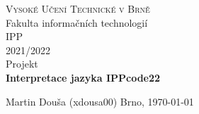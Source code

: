 \documentclass{article}
\begin{document}
\clearpage
\begin{titlepage}
	\begin{center}
		\textsc{\LARGE Vysoké Učení Technické v Brně}\\[0.5cm]
		{\LARGE Fakulta informačních technologií }\\[4.0cm]

		\textsc{\LARGE IPP}\\[0.5cm]
		\textsc{\LARGE 2021/2022}\\[3.5cm]

		{\LARGE Projekt}\\[0.5cm]
    {\LARGE \textbf{Interpretace jazyka IPPcode22}}\\
	\end{center}

	\vfill 

	\begin{flushleft} 
		\large
		Martin Douša (xdousa00)
		\hfill
		Brno, \today
	\end{flushleft}
\end{titlepage}
\thispagestyle{empty}

\newpage
\tableofcontents


\newpage




\end{document}
